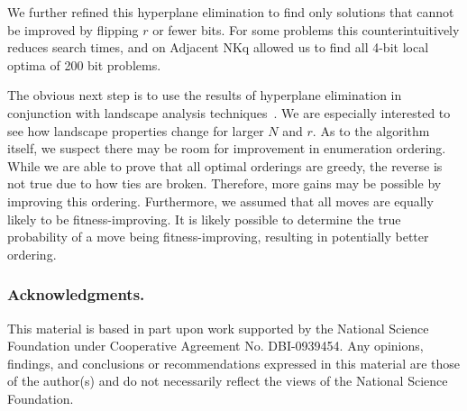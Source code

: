 \documentclass[runningheads,a4paper]{llncs}
\begin{document}
We further refined this hyperplane elimination to find only solutions
that cannot be improved by flipping $r$ or fewer bits. For some problems
this counterintuitively reduces search times, and on Adjacent NKq allowed
us to find all 4-bit local optima of 200 bit problems.

The obvious next step is to use the results of hyperplane elimination
in conjunction with landscape analysis
techniques~\cite{tomassini:2008:nknetworks,verel:2011:nknetworks,ochoa:2015:crossovernetworks}.
We are especially interested to see how landscape properties change for larger $N$
and $r$. As to the algorithm itself, we suspect there may be room for improvement
in enumeration ordering. While we are able to prove that all optimal orderings
are greedy, the reverse is not true due to how ties are broken. Therefore, more
gains may be possible by improving this ordering. Furthermore, we assumed
that all moves are equally likely to be fitness-improving. It is likely possible
to determine the true probability of a move being fitness-improving, resulting
in potentially better ordering.

\subsubsection*{Acknowledgments.}
This material is based in part upon work supported by the National Science Foundation
under Cooperative Agreement No. DBI-0939454. Any opinions, findings, and conclusions
or recommendations expressed in this material are those of the author(s) and do not
necessarily reflect the views of the National Science Foundation.



\end{document}

